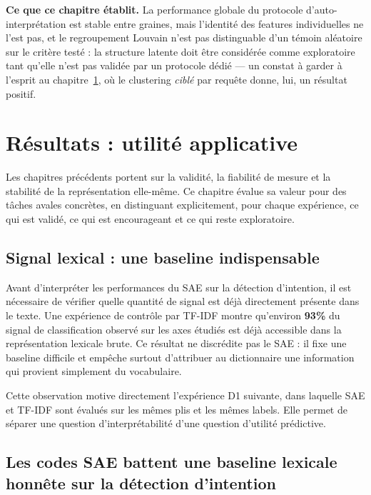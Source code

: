 \documentclass[11pt]{article}
\begin{document}
\medskip
\noindent\textbf{Ce que ce chapitre établit.} La performance globale du
protocole d'auto-interprétation est stable entre graines, mais l'identité des
features individuelles ne l'est pas, et le regroupement Louvain n'est pas
distinguable d'un témoin aléatoire sur le critère testé : la structure
latente doit être considérée comme exploratoire tant qu'elle n'est pas
validée par un protocole dédié --- un constat à garder à l'esprit au
chapitre~\ref{sec:resultats-utilite}, où le clustering \emph{ciblé} par
requête donne, lui, un résultat positif.
\newpage
\section{Résultats : utilité applicative}
\label{sec:resultats-utilite}

Les chapitres précédents portent sur la validité, la fiabilité de mesure et
la stabilité de la représentation elle-même. Ce chapitre évalue sa valeur
pour des tâches avales concrètes, en distinguant explicitement, pour chaque
expérience, ce qui est validé, ce qui est encourageant et ce qui reste
exploratoire.

\subsection{Signal lexical : une baseline indispensable}
\label{subsec:lexical-leakage}

Avant d'interpréter les performances du SAE sur la détection d'intention, il est
nécessaire de vérifier quelle quantité de signal est déjà directement présente dans
le texte. Une expérience de contrôle par TF-IDF montre qu'environ \textbf{93\%} du
signal de classification observé sur les axes étudiés est déjà accessible dans la
représentation lexicale brute. Ce résultat ne discrédite pas le SAE : il fixe une
baseline difficile et empêche surtout d'attribuer au dictionnaire une information
qui provient simplement du vocabulaire.

Cette observation motive directement l'expérience D1 suivante, dans laquelle SAE et
TF-IDF sont évalués sur les mêmes plis et les mêmes labels. Elle permet de séparer une
question d'interprétabilité d'une question d'utilité prédictive.

\subsection{Les codes SAE battent une baseline lexicale honnête sur la détection d'intention}
\label{subsec:d1-intent}
\end{document}
